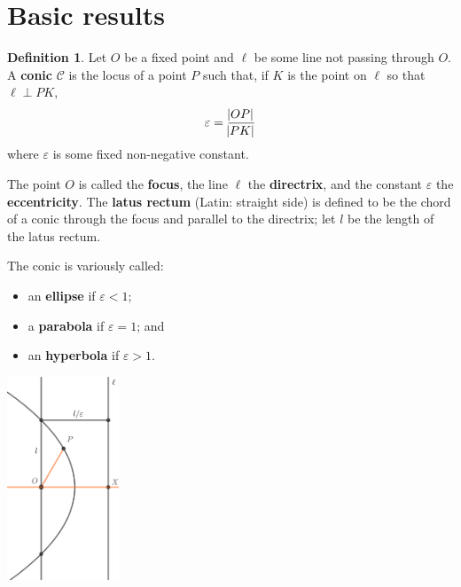 \documentclass[a4paper,leqno,10pt]{article}
\theoremstyle{exercise}
\theoremstyle{plain}
\theoremstyle{definition}
\newtheorem*{defn}{Definition}
\theoremstyle{remark}
\newcommand{\df}{\textbf}
\begin{document}
\section{Basic results}
\begin{defn}
  Let $ O $ be a fixed point and $ \ell $ be some line not passing through $ O $. A \df{conic} $ \mathcal{C} $ is the locus of a point $ P $ such
  that, if $ K $ is the point on $ \ell $ so that $ \ell \perp PK $,
  \begin{displaymath}
    \varepsilon = \frac{\abs{OP}}{\abs{PK}}
  \end{displaymath}
  where $ \varepsilon $ is some fixed non-negative constant.

  The point $ O $ is called the \df{focus}, the line $ \ell $ the \df{directrix}, and the constant $\varepsilon$ the \df{eccentricity}.
  The \df{latus rectum} (Latin: straight side) is defined to be the chord of a conic through the focus and parallel to the
  directrix; let $ l $ be the length of the latus rectum.

  The conic is variously called:
  \begin{itemize}
    \item an \df{ellipse} if $ \varepsilon < 1 $;
    \item a \df{parabola} if $ \varepsilon = 1 $; and
    \item an \df{hyperbola} if $ \varepsilon > 1 $.
  \end{itemize}

  \begin{center}
    \includegraphics[width=0.25\textwidth]{polar}
  \end{center}
\end{defn}
\end{document}
